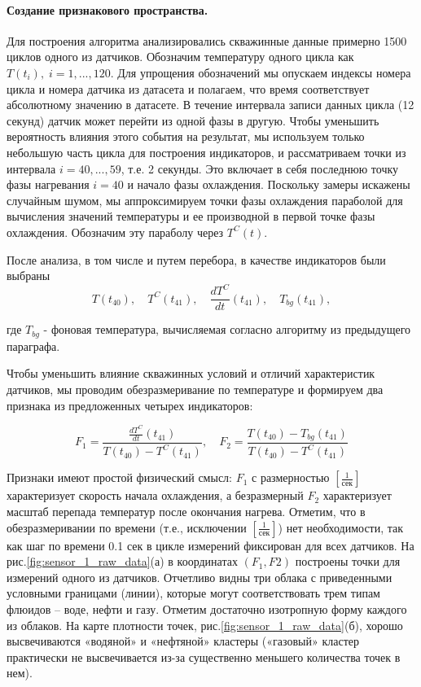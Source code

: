 \paragraph{Создание признакового пространства.} 
\par
Для построения алгоритма анализировались скважинные данные примерно 1500 циклов одного из датчиков. Обозначим температуру одного цикла как $T(t_i),\;i=1,...,120$. Для упрощения обозначений мы опускаем индексы номера цикла и номера датчика из датасета и полагаем, что время соответствует абсолютному значению в датасете.  В течение интервала записи данных цикла (12 секунд) датчик может перейти из одной фазы в другую. Чтобы уменьшить вероятность влияния этого события на результат, мы используем только небольшую часть цикла для построения индикаторов, и рассматриваем точки из интервала $i=40,...,59$, т.е. 2 секунды. Это включает в себя последнюю точку фазы нагревания $i=40$ и начало фазы охлаждения. Поскольку замеры искажены случайным шумом, мы аппроксимируем точки фазы охлаждения  параболой для вычисления значений температуры и ее производной в первой точке фазы охлаждения. Обозначим эту параболу через $T^C(t)$. 
\par
После анализа, в том числе и путем перебора, в качестве индикаторов были выбраны
\begin{equation}
    T(t_{40}),\quad T^C(t_{41}),\quad \frac{dT^C}{dt}(t_{41}),\quad T_{bg}(t_{41}),
\end{equation}

где $T_{bg}$ - фоновая температура, вычисляемая согласно алгоритму из предыдущего параграфа.
\par
Чтобы уменьшить влияние скважинных условий и отличий характеристик датчиков, мы проводим обезразмеривание по температуре и формируем два признака из предложенных четырех индикаторов:

\begin{equation}
    F_1 = \frac{\frac{dT^C}{dt}(t_{41})}{T(t_{40})-T^C(t_{41})},\quad F_2 = \frac{T(t_{40})-T_{bg}(t_{41})}{T(t_{40})-T^C(t_{41})}
\end{equation}
\par
Признаки имеют простой физический смысл: $F_1$ с размерностью $\left[\frac{1}{\text{сек}}\right]$ характеризует скорость начала охлаждения, а безразмерный  $F_2$ характеризует масштаб перепада температур после окончания нагрева. Отметим, что в обезразмеривании по времени (т.е., исключении $\left[\frac{1}{\text{сек}}\right]$) нет необходимости, так как шаг по времени 0.1 сек в цикле измерений фиксирован для всех датчиков.
На рис.\ref{fig:sensor_1_raw_data}(а) в координатах $\left(F_1, F2\right)$ построены точки для измерений одного из датчиков.  Отчетливо видны три облака с приведенными условными границами (линии), которые могут соответствовать трем типам флюидов – воде, нефти и газу. Отметим достаточно изотропную форму каждого из облаков. На карте плотности точек, рис.\ref{fig:sensor_1_raw_data}(б), хорошо высвечиваются «водяной» и «нефтяной» кластеры («газовый» кластер практически не высвечивается из-за существенно меньшего количества точек в нем).

